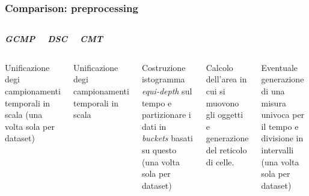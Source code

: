 \documentclass{beamer}
\begin{document}
\begin{frame}
	\frametitle{Comparison: preprocessing}
	\begin{columns}
		
		\begin{center}
			\textbf{\textit{\huge{GCMP}}}
			
		\end{center}
		
		\begin{center}
			\textbf{\textit{\huge{DSC}}}
			
		\end{center}
		
		\begin{center}
			\textbf{\textit{\huge{CMT}}}
			
		\end{center}
	\end{columns}
	\begin{columns}
		
		\column{.3\columnwidth}
		
		Unificazione degi campionamenti temporali in scala  (una volta sola per dataset)
		
		
		\column{.3\textwidth}
		
		Unificazione degi campionamenti temporali in scala
		
		Costruzione istogramma \textit{equi-depth} sul tempo e partizionare i dati in \textit{buckets}
		basati su questo  (una volta sola per dataset)
		
		\column{.3\textwidth}
		
		Calcolo dell'area in cui si muovono gli oggetti e generazione del reticolo di celle.
		
		Eventuale generazione di una misura univoca per il tempo e divisione in intervalli 
		 (una volta sola per dataset)
		
	\end{columns}
\end{frame}  
\end{document}
